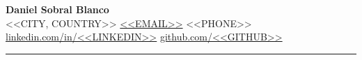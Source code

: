 \documentclass[10pt,a4paper]{article}
\begin{document}
\pagestyle{empty}

\begin{center}
  {\LARGE\bfseries Daniel Sobral Blanco}\\[3pt]
  <<CITY, COUNTRY>> \textbar{}
  \href{mailto:<<EMAIL>>}{<<EMAIL>>} \textbar{}
  <<PHONE>>\\
  \href{https://linkedin.com/in/<<LINKEDIN>>}{linkedin.com/in/<<LINKEDIN>>}
  \quad
  \href{https://github.com/<<GITHUB>>}{github.com/<<GITHUB>>}
\end{center}

\vspace{4pt}
\rule{\textwidth}{0.4pt}
\vspace{4pt}

\noindent
\end{document}
